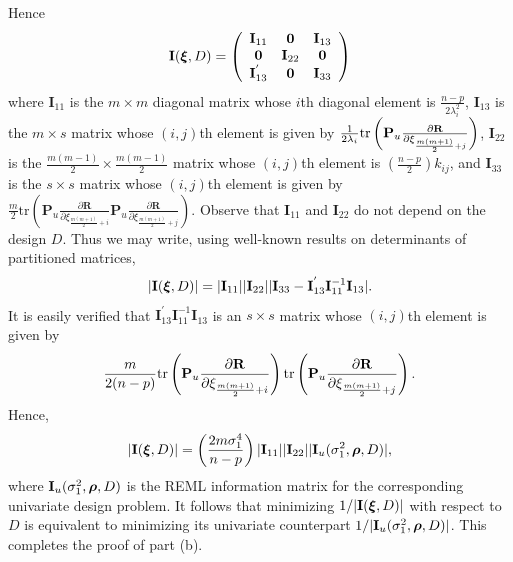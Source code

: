 \documentclass[12pt]{article}
\def\brho{\mbox{\boldmath$\rho$}}
\def\bxi{\mbox{\boldmath$\xi$}}
\newcommand{\mb}[1]{\mbox{\boldmath$#1$}}
\begin{document}
Hence
\[ \mathbf{I}(\mb\xi,D) = \left(
    \begin{array}{ccc}
      \mathbf{I}_{11}
       & \mathbf{0}
        &  \mathbf{I}_{13}
       \\
\mathbf{0} & \mathbf{I}_{22} & \mathbf{0}
          \\
\mathbf{I}_{13}^{'}
       & \mathbf{0}
        & \mathbf{I}_{33}\\
    \end{array}
  \right)
\]
where $\mathbf{I}_{11}$ is the $m\times m$ diagonal matrix whose $i$th diagonal element is $\frac{n-p}{2\lambda_{i}^2}$,
$\mathbf{I}_{13}$ is the $m\times s$ matrix whose $(i,j)$th element is given by $\frac{1}{2\lambda_{i}}\text{tr}\left({\bf P}_u\frac{\partial\mathbf{R}}{\partial\xi_{\frac{m(m+1)}{2}+j}}\right)$, $\mathbf{I}_{22}$ is the $\frac{m(m-1)}{2}\times \frac{m(m-1)}{2}$ matrix whose $(i,j)$th element is $\left(\frac{n-p}{2}\right)k_{ij}$, and $\mathbf{I}_{33}$ is the $s\times s$ matrix whose $(i,j)$th element is given by $\frac{m}{2}\text{tr}\left(\mathbf{P}_{u}\frac{\partial
\mathbf{R}}{\partial\xi_{\frac{m(m+1)}{2}+i}}\mathbf{P}_{u}\frac{\partial
\mathbf{R}}{\partial\xi_{\frac{m(m+1)}{2}+j}}\right)$.  Observe that $\mathbf{I}_{11}$ and $\mathbf{I}_{22}$ do not depend on the design $D$.
Thus we may write, using well-known results on determinants of partitioned matrices,
\[ |\mathbf{I}(\mb\xi,D)| = |\mathbf{I}_{11}||\mathbf{I}_{22}||\mathbf{I}_{33}-\mathbf{I}_{13}^{'}\mathbf{I}_{11}^{-1}\mathbf{I}_{13}|.
\]
It is easily verified that $\mathbf{I}_{13}^{'}\mathbf{I}_{11}^{-1}\mathbf{I}_{13}$ is an $s\times s$ matrix whose $(i,j)$th element is given by
\[ \frac{m}{2(n-p)}\text{tr}\left({\bf P}_u\frac{\partial\mathbf{R}}{\partial\xi_{\frac{m(m+1)}{2}+i}}\right)\text{tr}\left({\bf P}_u\frac{\partial\mathbf{R}}{\partial\xi_{\frac{m(m+1)}{2}+j}}\right).
\]
Hence, $$|\mathbf{I}(\mb\xi,D)|=\left(\frac{2m\sigma_{1}^4}{n-p}\right)|\mathbf{I}_{11}||\mathbf{I}_{22}||\mathbf{I}_{u}(\sigma_{1}^2,\brho,D)|,$$
where $\mathbf{I}_{u}(\sigma_{1}^2,\brho,D)$ is the REML information matrix for the corresponding univariate design problem. It follows that minimizing $1/|{\bf I}(\bxi,D)|$ with respect to $D$ is equivalent to minimizing its univariate counterpart $1/|{\bf I}_{u}(\sigma_{1}^2,\brho,D)|$.
This completes the proof of part (b).
\end{document}
